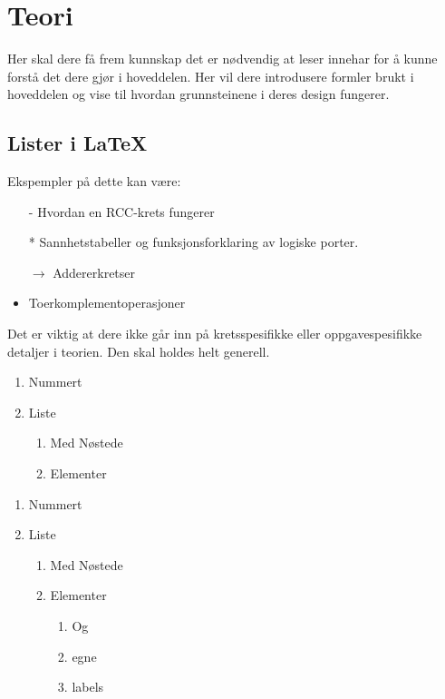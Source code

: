 \section{Teori}

Her skal dere få frem kunnskap det er nødvendig at leser innehar for å kunne forstå det dere gjør i hoveddelen.
Her vil dere introdusere formler brukt i hoveddelen og vise til hvordan grunnsteinene i deres design fungerer. 

\subsection{Lister i LaTeX}

Ekspempler på dette kan være:

\begin{itemize}
    \item[-] Hvordan en RCC-krets fungerer
    \item[*] Sannhetstabeller og funksjonsforklaring av logiske porter.
    \item[$\rightarrow$] Addererkretser
    \item Toerkomplementoperasjoner
\end{itemize}

Det er viktig at dere ikke går inn på kretsspesifikke eller oppgavespesifikke detaljer i teorien. Den skal holdes helt generell.

\begin{enumerate}
    \item Nummert
    \item Liste
    \begin{enumerate}
        \item Med Nøstede
        \item Elementer
    \end{enumerate}
\end{enumerate}

\begin{enumerate}[label=(\roman*)]
    \item Nummert
    \item Liste
    \begin{enumerate}[label=(\alph*)]
        \item Med Nøstede
        \item Elementer
        \begin{enumerate}[label=(\arabic*)]
            \item Og
            \item egne
            \item labels
        \end{enumerate}
    \end{enumerate}
\end{enumerate}

